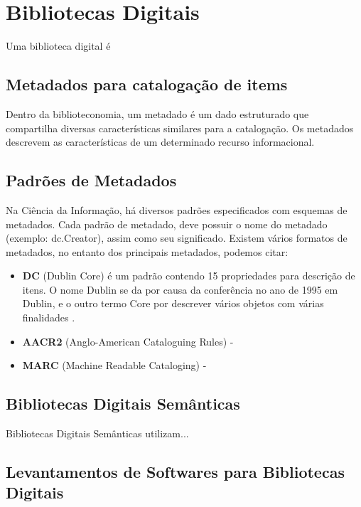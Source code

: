 \chapter{Bibliotecas Digitais}
Uma biblioteca digital é

\section{Metadados para catalogação de items}
Dentro da biblioteconomia, um metadado é um dado estruturado que compartilha diversas características similares para a catalogação. Os metadados descrevem as características de um determinado recurso informacional.
	
\section{Padrões de Metadados}
%
Na Ciência da Informação, há diversos padrões especificados com esquemas de metadados. Cada padrão de metadado, deve possuir o nome do metadado (exemplo: dc.Creator), assim como seu significado. Existem vários formatos de metadados, no entanto dos principais metadados, podemos citar:

\begin{itemize}
\item \textbf{DC} (Dublin Core) é um padrão contendo 15 propriedades para descrição de itens. O nome Dublin se da por causa da conferência no ano de 1995 em Dublin, e o outro termo Core por descrever vários objetos com várias finalidades \cite{dbcore2012set}.

\item \textbf{AACR2} (Anglo-American Cataloguing Rules) - 
\item \textbf{MARC} (Machine Readable Cataloging) - 
\end{itemize}


\section{Bibliotecas Digitais Semânticas}
%
Bibliotecas Digitais Semânticas utilizam...

\section{Levantamentos de Softwares para Bibliotecas Digitais}

